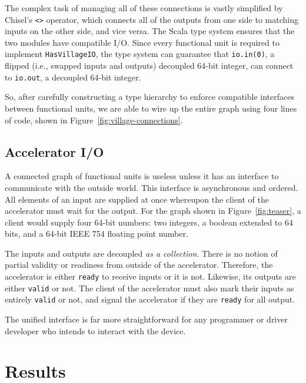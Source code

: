 \documentclass[sigconf, nonacm]{acmart}
\begin{document}
The complex task of managing all of these connections is vastly simplified by Chisel's \texttt{<>} operator, which connects all of the outputs from one side to matching inputs on the other side, and vice versa.
The Scala type system ensures that the two modules have compatible I/O.
Since every functional unit is required to implement \texttt{HasVillageIO}, the type system can guarantee that \texttt{io.in(0)}, a flipped (i.e., swapped inputs and outputs) decoupled 64-bit integer, can connect to \texttt{io.out}, a decoupled 64-bit integer.

So, after carefully constructing a type hierarchy to enforce compatible interfaces between functional units, we are able to wire up the entire graph using four lines of code, shown in Figure~\ref{fig:village-connections}.

\subsection{Accelerator I/O}
\label{sec:accelerator-io}

A connected graph of functional units is useless unless it has an interface to communicate with the outside world.
This interface is asynchronous and ordered.
All elements of an input are supplied at once whereupon the client of the accelerator must wait for the output.
For the graph shown in Figure~\ref{fig:teaser}, a client would supply four 64-bit numbers: two integers, a boolean extended to 64 bits, and a 64-bit IEEE 754 floating point number.

The inputs and outputs are decoupled \emph{as a collection}.
There is no notion of partial validity or readiness from outside of the accelerator.
Therefore, the accelerator is either \texttt{ready} to receive inputs or it is not.
Likewise, its outputs are either \texttt{valid} or not.
The client of the accelerator must also mark their inputs as entirely \texttt{valid} or not, and signal the accelerator if they are \texttt{ready} for all output.

The unified interface is far more straightforward for any programmer or driver developer who intends to interact with the device.


\section{Results}
\end{document}
